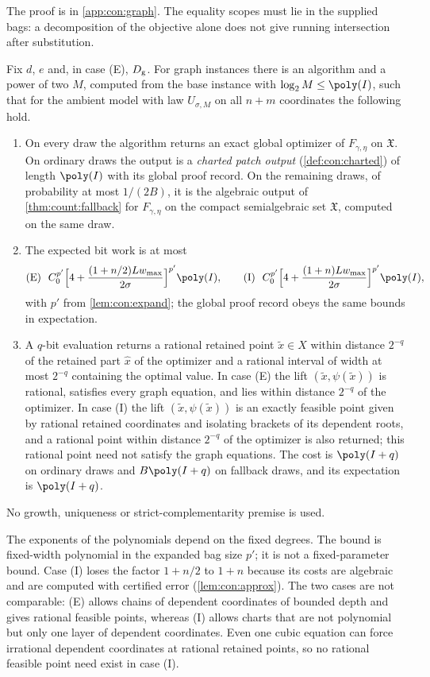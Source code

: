 The proof is in \cref{app:con:graph}. The equality scopes must lie in the
supplied bags: a decomposition of the objective alone does not give running
intersection after substitution.

\begin{theorem}\label{thm:con:graph}
Fix $d$, $e$ and, in case (E), $D_{\rm g}$. For graph instances there is an
algorithm and a power of two $M$, computed from the base instance with
$\log_2M\le\poly(I)$, such that for the ambient model with law $U_{\sigma,M}$
on all $n+m$ coordinates the following hold.
\begin{enumerate}[label=(\roman*)]
\item On every draw the algorithm returns an exact global optimizer of
$F_{\gamma,\eta}$ on $\mathfrak X$. On ordinary draws the output is a
\emph{charted patch output} (\cref{def:con:charted}) of length $\poly(I)$
with its global proof record. On the remaining draws, of probability at most
$1/(2B)$, it is the algebraic output of \cref{thm:count:fallback} for
$F_{\gamma,\eta}$ on the compact semialgebraic set $\mathfrak X$, computed on
the same draw.
\item The expected bit work is at most
\[
 \text{(E)}\ \ C_0^{p'}\Bigl[4+\frac{(1+n/2)Lw_{\max}}{2\sigma}\Bigr]^{p'}\poly(I),
 \qquad
 \text{(I)}\ \ C_0^{p'}\Bigl[4+\frac{(1+n)Lw_{\max}}{2\sigma}\Bigr]^{p'}\poly(I),
\]
with $p'$ from \cref{lem:con:expand}; the global proof record obeys the same
bounds in expectation.
\item A $q$-bit evaluation returns a rational retained point $\tilde x\in X$
within distance $2^{-q}$ of the retained part $\hat x$ of the optimizer and
a rational interval of width at most $2^{-q}$ containing the optimal value.
In case (E) the lift $(\tilde x,\psi(\tilde x))$ is rational, satisfies every
graph equation, and lies within distance $2^{-q}$ of the optimizer. In case
(I) the lift $(\tilde x,\psi(\tilde x))$ is an exactly feasible point given
by rational retained coordinates and isolating brackets of its dependent
roots, and a rational point within distance $2^{-q}$ of the optimizer is
also returned; this rational point need not satisfy the graph equations. The
cost is $\poly(I+q)$ on ordinary draws and $B\poly(I+q)$ on fallback draws,
and its expectation is $\poly(I+q)$.
\end{enumerate}
No growth, uniqueness or strict-complementarity premise is used.
\end{theorem}

The exponents of the polynomials depend on the fixed degrees. The bound is
fixed-width polynomial in the expanded bag size $p'$; it is not a
fixed-parameter bound. Case (I) loses the factor $1+n/2$ to $1+n$ because its
costs are algebraic and are computed with certified error
(\cref{lem:con:approx}). The two cases are not comparable: (E) allows chains of
dependent coordinates of bounded depth and gives rational feasible points,
whereas (I) allows charts that are not polynomial but only one layer of
dependent coordinates. Even one cubic equation can force irrational dependent
coordinates at rational retained points, so no rational feasible point
need exist in case (I).

